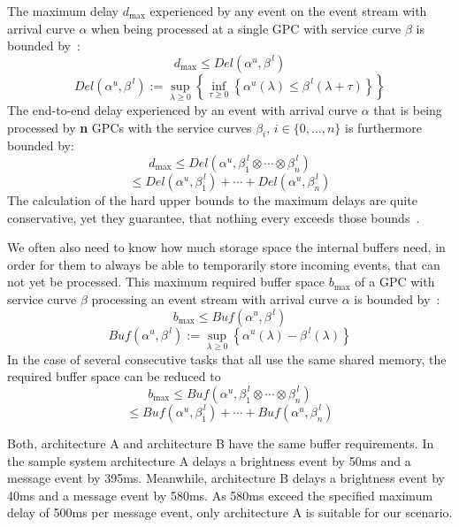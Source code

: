 
The maximum delay \textbf{\(d_{\max}\)} experienced by any event on the event stream with arrival curve \(\alpha\) when being processed at a single GPC with service curve \(\beta\) is bounded by~\cite{cho:08}:
\[d_{\max} \leq Del (\alpha ^{u}, \beta ^{\, l})\]
\[Del (\alpha ^{u}, \beta ^{\, l}) := \sup_{\lambda \geq 0} \left\{ \inf_{\tau \geq 0}\left\{\alpha^{u}(\lambda) \leq \beta^{\, l}(\lambda+\tau)\right\}\right\}\]
The end-to-end delay experienced by an event with arrival curve \(\alpha\) that is being processed by \textbf{n} GPCs with the service curves \(\beta_{i}, \, i \in \{0, \ldots, n\}\) is furthermore bounded by:
\[d_{\max} \leq Del (\alpha ^{u}, \beta ^{\, l} _ 1 \otimes \cdots \otimes \beta ^{\, l} _n )\]
\[\leq Del (\alpha ^{u}, \beta ^{\, l} _1 ) + \cdots +  Del (\alpha ^{u}, \beta ^{\, l} _n ) \]
The calculation of the hard upper bounds to the maximum delays are quite conservative, yet they guarantee, that nothing every exceeds those bounds~\cite{cho:08}.


We often also need to know how much storage space the internal buffers need, in order for them to always be able to temporarily store incoming events, that can not yet be processed.
This maximum required buffer space \textbf{\(b_{\max}\)} of a GPC with service curve \(\beta\) processing an event stream with arrival curve \(\alpha\) is bounded by~\cite{cho:08}:
\[b_{\max} \leq Buf \left(\alpha ^{u}, \beta ^{\, l}\right)\]
\[Buf \left(\alpha ^{u}, \beta ^{\, l}\right) := \sup _{\lambda \geq 0}\left\{\alpha^{u}(\lambda) - \beta^{\, l}(\lambda)\right\}\]
In the case of several consecutive tasks that all use the same shared memory, the required buffer space can be reduced to
\[b_{\max} \leq Buf (\alpha ^{u}, \beta ^{\, l} _ 1 \otimes \cdots \otimes \beta ^{\, l} _n )\] 
\[\leq Buf (\alpha ^{u}, \beta ^{\, l} _1) + \cdots +  Buf (\alpha ^{u}, \beta ^{\, l} _n ) \]


Both, architecture A and architecture B have the same buffer requirements.
In the sample system architecture A delays a brightness event by 50ms and a message event by 395ms.
Meanwhile, architecture B delays a brightness event by 40ms and a message event by 580ms.
As 580ms exceed the specified maximum delay of 500ms per message event, only architecture A is suitable for our scenario.